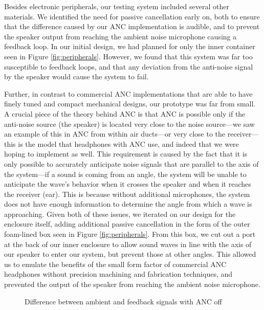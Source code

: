 \documentclass{fpgairpods}
\begin{document}
\bigskip

Besides electronic peripherals, our testing system included several other materials. We identified the need for passive cancellation early on, both to ensure that the difference caused by our ANC implementation is audible, and to prevent the speaker output from reaching the ambient noise microphone causing a feedback loop. In our initial design, we had planned for only the inner container seen in Figure \ref{fig:peripherals}. However, we found that this system was far too susceptible to feedback loops, and that any deviation from the anti-noise signal by the speaker would cause the system to fail.

Further, in contrast to commercial ANC implementations that are able to have finely tuned and compact mechanical designs, our prototype was far from small. A crucial piece of the theory behind ANC is that ANC is possible only if the anti-noise source (the speaker) is located very close to the noise source---we saw an example of this in ANC from within air ducts---or very close to the receiver---this is the model that headphones with ANC use, and indeed that we were hoping to implement as well. This requirement is caused by the fact that it is only possible to accurately anticipate noise signals that are parallel to the axis of the system---if a sound is coming from an angle, the system will be unable to anticipate the wave's behavior when it crosses the speaker and when it reaches the receiver (ear). This is because without additional microphones, the system does not have enough information to determine the angle from which a wave is approaching. Given both of these issues, we iterated on our design for the enclosure itself, adding additional passive cancellation in the form of the outer foam-lined box seen in Figure \ref{fig:peripherals}. From this box, we cut out a port at the back of our inner enclosure to allow sound waves in line with the axis of our speaker to enter our system, but prevent those at other angles. This allowed us to emulate the benefits of the small form factor of commercial ANC headphones without precision machining and fabrication techniques, and prevented the output of the speaker from reaching the ambient noise microphone.


\begin{figure}
    \centering
    \caption{Difference between ambient and feedback signals with ANC off}
    \label{chart:anc_freq_response}
\end{figure}
\end{document}
